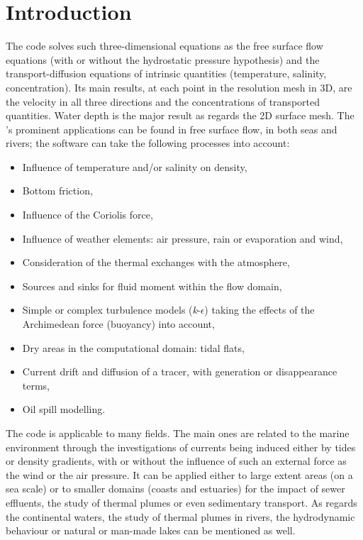 \chapter{Introduction}

The  code solves such three-dimensional equations as the free
surface flow equations (with or without the hydrostatic pressure hypothesis)
and the transport-diffusion equations of intrinsic quantities (temperature,
salinity, concentration). Its main results, at each point in the resolution
mesh in 3D, are the velocity in all three directions and the concentrations of
transported quantities. Water depth is the major result as regards the 2D
surface mesh. The 's prominent applications can be found in free
surface flow, in both seas and rivers; the software can take the following
processes into account:

\begin{itemize}
\item Influence of temperature and/or salinity on density,
\item Bottom friction,
\item Influence of the Coriolis force,
\item Influence of weather elements: air pressure, rain or evaporation and
wind,
\item Consideration of the thermal exchanges with the atmosphere,
\item Sources and sinks for fluid moment within the flow domain,
\item Simple or complex turbulence models (\textit{k}-$\epsilon$) taking the
effects of the Archimedean force (buoyancy) into account,
\item Dry areas in the computational domain: tidal flats,
\item Current drift and diffusion of a tracer, with generation or
disappearance terms,
\item Oil spill modelling.
\end{itemize}

The code is applicable to many fields. The main ones are related to the marine
environment through the investigations of currents being induced either by
tides or density gradients, with or without the influence of such an external
force as the wind or the air pressure. It can be applied either to large extent
areas (on a sea scale) or to smaller domains (coasts and estuaries) for the
impact of sewer effluents, the study of thermal plumes or even sedimentary
transport. As regards the continental waters, the study of thermal plumes in
rivers, the hydrodynamic behaviour or natural or man-made lakes can be
mentioned as well.


